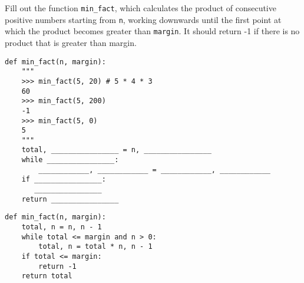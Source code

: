 \question Fill out the function \lstinline{min_fact}, which calculates the product of consecutive positive numbers starting from \lstinline{n}, working downwards until the first point at which the product becomes greater than \lstinline{margin}. It should return -1 if there is no product that is greater than margin.

\begin{blocksection}
\begin{lstlisting}
def min_fact(n, margin):
    """
    >>> min_fact(5, 20) # 5 * 4 * 3
    60
    >>> min_fact(5, 200)
    -1
    >>> min_fact(5, 0)
    5
    """
    total, ________________ = n, ________________
    while ________________:
        ____________, ____________ = ____________, ____________
    if ________________:
       ________________
    return ________________

\end{lstlisting}
\end{blocksection}

\begin{blocksection}
\begin{solution}
\begin{lstlisting}
def min_fact(n, margin):
    total, n = n, n - 1
    while total <= margin and n > 0:
        total, n = total * n, n - 1
    if total <= margin:
        return -1
    return total
\end{lstlisting}
\end{solution}
\end{blocksection}